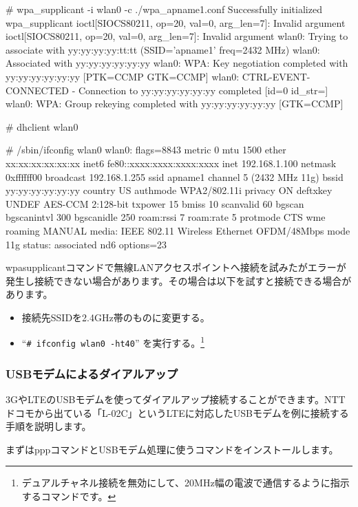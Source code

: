 \documentclass[mingoth,a4paper]{jsarticle}
\begin{document}
\begin{commandline}
  # wpa_supplicant -i wlan0 -c ./wpa_apname1.conf
  Successfully initialized wpa_supplicant
  ioctl[SIOCS80211, op=20, val=0, arg_len=7]: Invalid argument
  ioctl[SIOCS80211, op=20, val=0, arg_len=7]: Invalid argument
  wlan0: Trying to associate with yy:yy:yy:yy:tt:tt (SSID='apname1' freq=2432 MHz)
  wlan0: Associated with yy:yy:yy:yy:yy:yy
  wlan0: WPA: Key negotiation completed with yy:yy:yy:yy:yy:yy [PTK=CCMP GTK=CCMP]
  wlan0: CTRL-EVENT-CONNECTED - Connection to yy:yy:yy:yy:yy:yy completed [id=0 id_str=]
  wlan0: WPA: Group rekeying completed with yy:yy:yy:yy:yy:yy [GTK=CCMP]

  # dhclient wlan0

  # /sbin/ifconfig wlan0
  wlan0: flags=8843 metric 0 mtu 1500
  ether xx:xx:xx:xx:xx:xx
  inet6 fe80::xxxx:xxxx:xxxx:xxxx%
  inet 192.168.1.100 netmask 0xffffff00 broadcast 192.168.1.255
  ssid apname1 channel 5 (2432 MHz 11g) bssid yy:yy:yy:yy:yy:yy
  country US authmode WPA2/802.11i privacy ON deftxkey UNDEF
  AES-CCM 2:128-bit txpower 15 bmiss 10 scanvalid 60 bgscan
  bgscanintvl 300 bgscanidle 250 roam:rssi 7 roam:rate 5 protmode CTS
  wme roaming MANUAL
  media: IEEE 802.11 Wireless Ethernet OFDM/48Mbps mode 11g
  status: associated
          nd6 options=23
\end{commandline}

wpasupplicantコマンドで無線LANアクセスポイントへ接続を試みたがエラーが発生し接続できない場合があります。その場合は以下を試すと接続できる場合があります。

\begin{itemize}
  \item 接続先SSIDを2.4GHz帯のものに変更する。
  \item ``\texttt{\# ifconfig wlan0 -ht40}'' を実行する。\footnote{デュアルチャネル接続を無効にして、20MHz幅の電波で通信するように指示するコマンドです。}
\end{itemize}


\subsubsection{USBモデムによるダイアルアップ}

3GやLTEのUSBモデムを使ってダイアルアップ接続することができます。NTTドコモから出ている「L-02C」というLTEに対応したUSBモデムを例に接続する手順を説明します。

まずはpppコマンドとUSBモデム処理に使うコマンドをインストールします。
\end{document}
